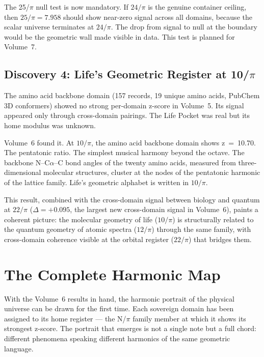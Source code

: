 \documentclass[11pt, letterpaper, openany]{book}
\begin{document}
The 25/$\pi$ null test is now mandatory.
If $24/\pi$ is the genuine container ceiling, then $25/\pi = 7.958$ should show near-zero signal across all domains, because the scalar universe terminates at $24/\pi$.
The drop from signal to null at the boundary would be the geometric wall made visible in data.
This test is planned for Volume~7.

\section*{Discovery 4: Life's Geometric Register at 10/$\pi$}

The amino acid backbone domain (157 records, 19 unique amino acids, PubChem 3D conformers) showed no strong per-domain z-score in Volume~5.
Its signal appeared only through cross-domain pairings. The Life Pocket was real but its home modulus was unknown.

Volume~6 found it.
At $10/\pi$, the amino acid backbone domain shows z~=~10.70. The pentatonic ratio. The simplest musical harmony beyond the octave.
The backbone N--C$\alpha$--C bond angles of the twenty amino acids, measured from three-dimensional molecular structures, cluster at the nodes of the pentatonic harmonic of the lattice family.
Life's geometric alphabet is written in $10/\pi$.

This result, combined with the cross-domain signal between biology and quantum at $22/\pi$ ($\Delta = +0.095$, the largest new cross-domain signal in Volume~6), paints a coherent picture: the molecular geometry of life ($10/\pi$) is structurally related to the quantum geometry of atomic spectra ($12/\pi$) through the same family, with cross-domain coherence visible at the orbital register ($22/\pi$) that bridges them.

\chapter{The Complete Harmonic Map}

With the Volume~6 results in hand, the harmonic portrait of the physical universe can be drawn for the first time.
Each sovereign domain has been assigned to its home register --- the N/$\pi$ family member at which it shows its strongest z-score.
The portrait that emerges is not a single note but a full chord: different phenomena speaking different harmonics of the same geometric language.
\end{document}
